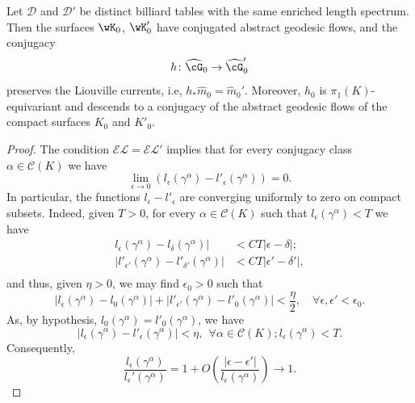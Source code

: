 \documentclass[reqno,11pt]{amsart}
\begin{document}
\begin{theorem}\label{thm:conj_abst_flow}
    Let \( \mathcal{D} \) and \( \mathcal{D}' \) be distinct billiard tables with the same enriched length spectrum.
    Then the surfaces \( \wK_0 \), \( \wK_0' \) have conjugated abstract geodesic flows, and the conjugacy
    \[
        h\colon \widehat{\cG}_0 \to \widehat{\cG}_0'
    \]
    preserves the Liouville currents, i.e, \(h_*\widehat{m}_0 =\widehat{m}_0'\).
    Moreover, \(h_0\) is \(\pi_1(K)\)-equivariant and descends to a conjugacy of the abstract geodesic flows of the compact surfaces \(K_0\) and \(K'_0\).
\end{theorem}
\begin{proof}
    The condition \( \mathcal{EL} = \mathcal{EL}' \) implies that for every conjugacy class \( \alpha \in \mathcal{C}(K) \) we have
    \[
       \lim_{\epsilon \to 0} \left(l_\epsilon(\gamma^\alpha)-l'_\epsilon(\gamma^\alpha)\right) = 0.
    \]
    In particular, the functions \( l_\epsilon - l'_\epsilon \) are converging uniformly to zero on compact subsets.  
    Indeed, given \(T > 0\), for every \(\alpha \in \mathcal{C}(K)\) such that \(l_\epsilon(\gamma^\alpha) < T\) we have 
    \[
    \begin{split}
        l_\epsilon(\gamma^\alpha) - l_\delta(\gamma^\alpha)| &< CT|\epsilon - \delta|; \\
        |l'_{\epsilon'}(\gamma^\alpha) - l'_{\delta'}(\gamma^\alpha)| &< CT|\epsilon' - \delta'|, \\
    \end{split}
    \]
    and thus, given \(\eta >0\), we may find \( \epsilon_0 >0\) such that
    \[
        |l_\epsilon(\gamma^\alpha) - l_0(\gamma^\alpha)| + |l'_{\epsilon'}(\gamma^\alpha) - l'_0(\gamma^\alpha)| < \frac{\eta}{2},\quad \forall \epsilon, \epsilon' <  \epsilon_0.
    \]
    As, by hypothesis, \(l_0(\gamma^\alpha) = l'_0(\gamma^\alpha)\), we have
    \[
        |l_\epsilon(\gamma^\alpha) - l'_\epsilon(\gamma^\alpha)| < \eta, \ \ \forall \alpha \in \mathcal{C}(K); l_\epsilon(\gamma^\alpha) < T.
    \]
    Consequently, 
    \[
        \frac{l_\epsilon(\gamma^\alpha)}{l_\epsilon'(\gamma^\alpha)} = 1 + O\left(\frac{|\epsilon-\epsilon'|}{l_\epsilon(\gamma^\alpha)}\right) \to 1.
    \]


\end{proof}
\end{document}
